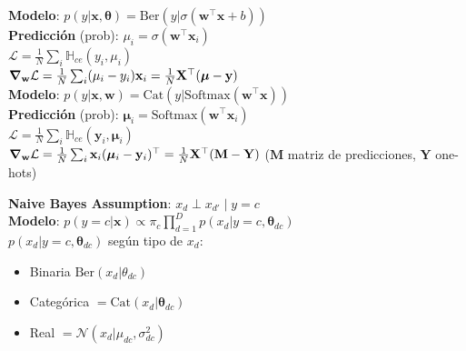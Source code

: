 \documentclass[11pt, a4paper]{article}
\newcommand{\w}{\mathbf{w}}
\newcommand{\x}{\mathbf{x}}
\newcommand{\y}{\mathbf{y}}
\newcommand{\Loss}{\mathcal{L}}
\begin{document}
\begin{minipage}[t]{0.325\textwidth}
    \vspace{0pt}
    \begin{tcolorbox}[formulabox=Logistic Regression {\tiny(binary/multiclass)}, colframe=softRed]
        \textbf{Modelo}: $p(y|\x,\boldsymbol{\theta})=\text{Ber}(y|\sigma(\w^\top \x+b))$ \\
        \textbf{Predicción} (prob): $\mu_i = \sigma(\w^\top \x_i)$ \\
        $\Loss = \frac{1}{N} \sum_i \mathbb{H}_{ce}(y_i, \mu_i)$ \\
        $\grad_\w \Loss = \frac{1}{N} \sum_i (\mu_i - y_i)\x_i = \frac{1}{N}\mathbf{X}^\top(\boldsymbol{\mu} - \y)$\\[3pt]
        \vspace{-2mm}
        \tcbline
        \vspace{-2mm}
        \textbf{Modelo}: $p(y|\x,\w)=\text{Cat}(y|\text{Softmax}(\w^\top \x))$ \\
        \textbf{Predicción} (prob): $\boldsymbol{\mu}_i = \text{Softmax}(\w^\top \x_i)$ \\
        $\Loss = \frac{1}{N} \sum_i \mathbb{H}_{ce}(\y_i, \boldsymbol{\mu}_i)$ \\
        $\grad_\w \Loss = \frac{1}{N} \sum_i \x_i(\boldsymbol{\mu}_i-\y_i)^\top = \frac{1}{N}\mathbf{X}^\top(\mathbf{M} - \mathbf{Y})$
        ($\mathbf{M}$ matriz de predicciones, $\mathbf{Y}$ one-hots)
    \end{tcolorbox}
    \begin{tcolorbox}[formulabox=Naive Bayes, colframe=softRed]
        \textbf{Naive Bayes Assumption}: $x_d \perp x_{d'} \mid y=c$\\
        \textbf{Modelo}: $p(y=c|\x) \propto \pi_c \prod_{d=1}^{D} p(x_d|y=c,\boldsymbol{\theta}_{dc})$\\
        $p(x_d|y=c,\boldsymbol{\theta}_{dc})$ según tipo de $x_d$: \\
        \begin{itemize}
            \item Binaria $\text{Ber}(x_d|\theta_{dc})$ \\
            \item Categórica $= \text{Cat}(x_d | \boldsymbol{\theta}_{dc})$ \\
            \item Real $= \mathcal{N}(x_d|\mu_{dc},\sigma^2_{dc})$ \\
        \end{itemize}

\end{tcolorbox}
\end{minipage}
\end{document}
